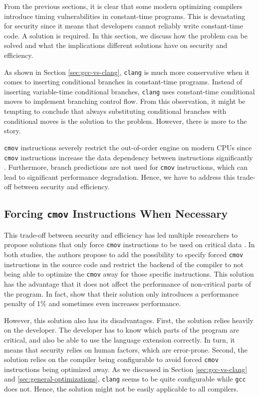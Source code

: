 \label{sec:discussion}
From the previous sections, it is clear that some modern optimizing compilers introduce timing vulnerabilities in constant-time programs.
This is devastating for security since it means that developers cannot reliably write constant-time code.
A solution is required.
In this section, we discuss how the problem can be solved and what the implications different solutions have on security and efficiency.

As shown in Section \ref{sec:gcc-vs-clang}, \texttt{clang} is much more conservative when it comes to inserting conditional branches in constant-time programs.
Instead of inserting variable-time conditional branches, \texttt{clang} uses constant-time conditional moves to implement branching control flow.
From this observation, it might be tempting to conclude that always substituting conditional branches with conditional moves is the solution to the problem.
However, there is more to the story.

\texttt{cmov} instructions severely restrict the out-of-order engine on modern CPUs since \texttt{cmov} instructions increase the data dependency between instructions significantly \citep{intel-optimization-reference}. 
Furthermore, branch predictions are not used for \texttt{cmov} instructions, which can lead to significant performance degradation.
Hence, we have to address this trade-off between security and efficiency.

\subsection{Forcing \texttt{cmov} Instructions When Necessary}
\label{sec:forcing-cmov}
This trade-off between security and efficiency has led multiple researchers to propose solutions that only force \texttt{cmov} instructions to be used on critical data \citep{what-you-c,llvm-issues-blog-post}.
In both studies, the authors propose to add the possibility to specify forced \texttt{cmov} instructions in the source code and restrict the backend of the compiler to not being able to optimize the \texttt{cmov} away for those specific instructions.
This solution has the advantage that it does not affect the performance of non-critical parts of the program.
In fact, \citeauthor{what-you-c} show that their solution only introduces a performance penalty of 1\% and sometimes even increases performance.

However, this solution also has its disadvantages.
First, the solution relies heavily on the developer.
The developer has to know which parts of the program are critical, and also be able to use the language extension correctly.
In turn, it means that security relies on human factors, which are error-prone.
Second, the solution relies on the compiler being configurable to avoid forced \texttt{cmov} instructions being optimized away.
As we discussed in Section \ref{sec:gcc-vs-clang} and \ref{sec:general-optimizations}, \texttt{clang} seems to be quite configurable while \texttt{gcc} does not.
Hence, the solution might not be easily applicable to all compilers.

